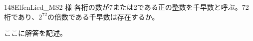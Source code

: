 \begin{thm}{148}{}{ElfenLied\_MS2 様}
 各桁の数が7または2である正の整数を千早数と呼ぶ。72桁であり、$2^{72}$の倍数である千早数は存在するか。
\end{thm}

ここに解答を記述。